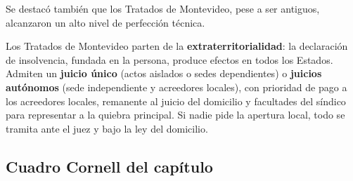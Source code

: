 \documentclass[12pt,oneside]{book}
\begin{document}
Se destacó también que los Tratados de Montevideo, pese a ser antiguos, alcanzaron un alto nivel de perfección técnica.

\begin{important}
Los Tratados de Montevideo parten de la \textbf{extraterritorialidad}: la declaración de insolvencia, fundada en la persona, produce efectos en todos los Estados. Admiten un \textbf{juicio único} (actos aislados o sedes dependientes) o \textbf{juicios autónomos} (sede independiente y acreedores locales), con prioridad de pago a los acreedores locales, remanente al juicio del domicilio y facultades del síndico para representar a la quiebra principal. Si nadie pide la apertura local, todo se tramita ante el juez y bajo la ley del domicilio.
\end{important}

\subsection*{Cuadro Cornell del capítulo}
\end{document}
